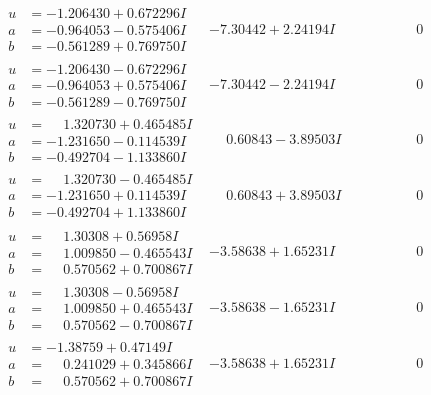 \documentclass[1p]{elsarticle_modified}
\theoremstyle{definition}
\begin{document}
$$\begin{array}{c|c|c}
\begin{aligned}
u &= -1.206430 + 0.672296 I \\
a &= -0.964053 - 0.575406 I \\
b &= -0.561289 + 0.769750 I\end{aligned}
 & -7.30442 + 2.24194 I & \phantom{-0.000000 } 0 \\ \hline\begin{aligned}
u &= -1.206430 - 0.672296 I \\
a &= -0.964053 + 0.575406 I \\
b &= -0.561289 - 0.769750 I\end{aligned}
 & -7.30442 - 2.24194 I & \phantom{-0.000000 } 0 \\ \hline\begin{aligned}
u &= \phantom{-}1.320730 + 0.465485 I \\
a &= -1.231650 - 0.114539 I \\
b &= -0.492704 - 1.133860 I\end{aligned}
 & \phantom{-}0.60843 - 3.89503 I & \phantom{-0.000000 } 0 \\ \hline\begin{aligned}
u &= \phantom{-}1.320730 - 0.465485 I \\
a &= -1.231650 + 0.114539 I \\
b &= -0.492704 + 1.133860 I\end{aligned}
 & \phantom{-}0.60843 + 3.89503 I & \phantom{-0.000000 } 0 \\ \hline\begin{aligned}
u &= \phantom{-}1.30308 + 0.56958 I \\
a &= \phantom{-}1.009850 - 0.465543 I \\
b &= \phantom{-}0.570562 + 0.700867 I\end{aligned}
 & -3.58638 + 1.65231 I & \phantom{-0.000000 } 0 \\ \hline\begin{aligned}
u &= \phantom{-}1.30308 - 0.56958 I \\
a &= \phantom{-}1.009850 + 0.465543 I \\
b &= \phantom{-}0.570562 - 0.700867 I\end{aligned}
 & -3.58638 - 1.65231 I & \phantom{-0.000000 } 0 \\ \hline\begin{aligned}
u &= -1.38759 + 0.47149 I \\
a &= \phantom{-}0.241029 + 0.345866 I \\
b &= \phantom{-}0.570562 + 0.700867 I\end{aligned}
 & -3.58638 + 1.65231 I & \phantom{-0.000000 } 0\\

\end{array}$$
\end{document}
